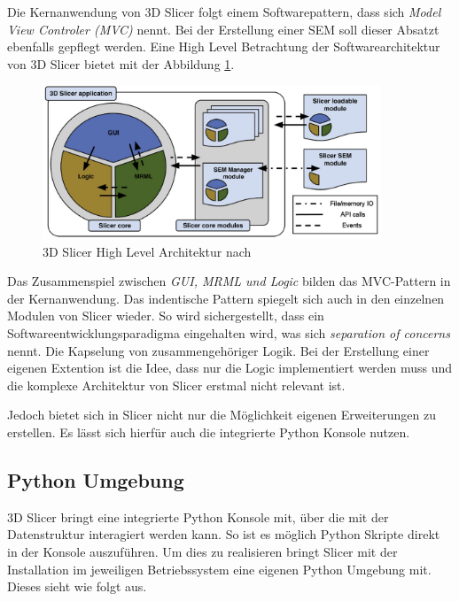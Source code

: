 Die Kernanwendung von 3D Slicer folgt einem Softwarepattern, dass sich \textit{Model
View Controler (MVC)} nennt. Bei der Erstellung einer SEM soll dieser Absatzt ebenfalls
gepflegt werden. Eine High Level Betrachtung der Softwarearchitektur von 3D
Slicer bietet \cite[Seite 1332]{fedorov2012slicer} mit der Abbildung
\ref{fig:3d_slicer_architektur}.

\begin{figure}[h]
	\centering
	\includegraphics[width=0.9\textwidth]{img/3d_slicer_architektur.jpg}
	\caption{3D Slicer High Level Architektur nach \citet[Seite 1326]{fedorov2012slicer}}
	\label{fig:3d_slicer_architektur}
\end{figure}

Das Zusammenspiel zwischen \textit{GUI, MRML und Logic} bilden das MVC-Pattern
in der Kernanwendung. Das indentische Pattern spiegelt sich auch in den einzelnen
Modulen von Slicer wieder. So wird sichergestellt, dass ein Softwareentwicklungsparadigma
eingehalten wird, was sich \textit{separation of concerns} nennt. Die Kapselung
von zusammengehöriger Logik. Bei der Erstellung einer eigenen Extention ist die Idee,
dass nur die Logic implementiert werden muss und die komplexe Architektur von
Slicer erstmal nicht relevant ist.

Jedoch bietet sich in Slicer nicht nur die Möglichkeit eigenen Erweiterungen zu
erstellen. Es lässt sich hierfür auch die integrierte Python Konsole nutzen.

\subsection{Python Umgebung}
\label{subsec:pythob_umgebung} 3D Slicer bringt eine integrierte Python Konsole mit,
über die mit der Datenstruktur interagiert werden kann. So ist es möglich Python
Skripte direkt in der Konsole auszuführen. Um dies zu realisieren bringt Slicer
mit der Installation im jeweiligen Betriebssystem eine eigenen Python Umgebung
mit. Dieses sieht wie folgt aus.

